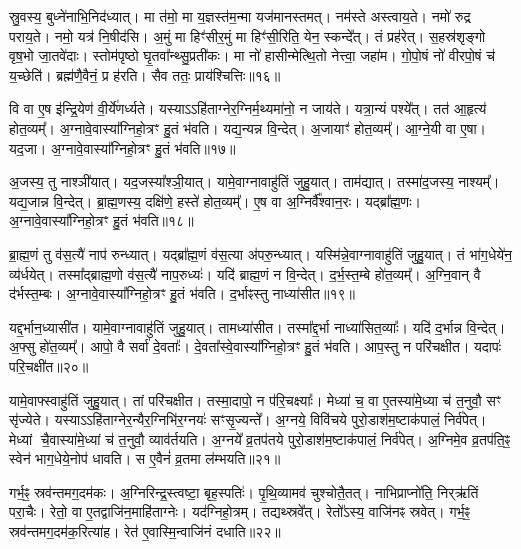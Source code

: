 स्रु॒वस्य॒ बुध्ने॑नाभि॒निद॑ध्यात्।
मा त॑मो॒ मा य॒ज्ञस्त॑म॒न्मा यज॑मानस्तमत्।
नम॑स्ते अस्त्वाय॒ते।
नमो॑ रुद्र पराय॒ते।
नमो॒ यत्र॑ नि॒षीद॑सि।
अ॒मुं मा हिꣳ॑सीर॒मुं मा हिꣳ॑सी॒रिति॒ येन॒ स्कन्दे᳚त्।
तं प्रह॑रेत्।
स॒हस्र॑शृङ्गो वृष॒भो जा॒तवे॑दाः।
स्तोम॑पृष्ठो घृ॒तवा᳚न्थ्सु॒प्रती॑कः।
मा नो॑ हासीन्मेत्थि॒तो नेत्त्वा॒ जहा॑म।
गो॒पो॒षं नो॑ वीरपो॒षं च॑ य॒च्छेति॑।
ब्रह्म॑णै॒वैनं॒ प्र ह॑रति।
सैव ततः॒ प्राय॑श्चित्तिः॥१६॥

वि वा ए॒ष इ॑न्द्रि॒येण॑ वी॒र्ये॑णर्ध्यते।
यस्याऽऽहि॑ताग्ने\-र॒ग्निर्म॒थ्य\-मा॑नो॒ न जाय॑ते।
यत्रा॒न्यं पश्ये᳚त्।
तत॑ आ॒हृत्य॑ होत॒व्यम्᳚।
अ॒ग्नावे॒वास्या᳚ग्निहो॒त्रꣳ हु॒तं भ॑वति।
यद्य॒न्यन्न वि॒न्देत्।
अ॒जायाꣳ॑ होत॒व्यम्᳚।
आ॒ग्ने॒यी वा ए॒षा।
यद॒जा।
अ॒ग्नावे॒वास्या᳚ग्निहो॒त्रꣳ हु॒तं भ॑वति॥१७॥

अ॒जस्य॒ तु नाश्ञी॑यात्।
यद॒जस्या᳚श्ञी॒यात्।
यामे॒वाग्नावाहु॑तिं जुहु॒यात्।
ताम॑द्यात्।
तस्मा॑द॒जस्य॒ नाश्यम्᳚।
यद्य॒जान्न वि॒न्देत्।
ब्रा॒ह्म॒णस्य॒ दक्षि॑णे॒ हस्ते॑ होत॒व्यम्᳚।
ए॒ष वा अ॒ग्निर्वै᳚श्वान॒रः।
यद्ब्रा᳚ह्म॒णः।
अ॒ग्नावे॒वास्या᳚ग्निहो॒त्रꣳ हु॒तं भ॑वति॥१८॥

ब्रा॒ह्म॒णं तु व॑स॒त्यै॑ नाप॑ रुन्ध्यात्।
यद्ब्रा᳚ह्म॒णं व॑स॒त्या अ॑परु॒न्ध्यात्।
यस्मि॑न्ने॒वाग्नावाहु॑तिं जुहु॒यात्।
तं भा॑ग॒धेये॑न॒ व्य॑र्धयेत्।
तस्मा᳚द्ब्राह्म॒णो व॑स॒त्यै॑ नाप॒रुध्यः॑।
यदि॑ ब्राह्म॒णं न वि॒न्देत्।
द॒र्भ॒स्त॒म्बे हो॑त॒व्यम्᳚।
अ॒ग्नि॒वान् वै द॑र्भस्त॒म्बः।
अ॒ग्नावे॒वास्या᳚ग्निहो॒त्रꣳ हु॒तं भ॑वति।
द॒र्भाꣴस्तु नाध्या॑सीत॥१९॥

यद्द॒र्भान॒ध्यासी॑त।
यामे॒वाग्नावाहु॑तिं जुहु॒यात्।
तामध्या॑सीत।
तस्मा᳚द्द॒र्भा नाध्या॑सित॒व्याः᳚।
यदि॑ द॒र्भान्न वि॒न्देत्।
अ॒फ्सु हो॑त॒व्यम्᳚।
आपो॒ वै सर्वा॑ दे॒वताः᳚।
दे॒वता᳚स्वे॒वास्या᳚ग्निहो॒त्रꣳ हु॒तं भ॑वति।
आप॒स्तु न परि॑चक्षीत।
यदापः॑ परि॒चक्षी॑त॥२०॥

यामे॒वाफ्स्वाहु॑तिं जुहु॒यात्।
तां परि॑चक्षीत।
तस्मा॒दापो॒ न प॑रि॒चक्ष्याः᳚।
मेध्या॑ च॒ वा ए॒तस्या॑मे॒ध्या च॑ त॒नुवौ॒ सꣳ सृ॑ज्येते।
यस्याऽऽहि॑ताग्नेर॒न्यैर॒ग्निभि॑र॒ग्नयः॑ सꣳसृ॒ज्यन्ते᳚।
अ॒ग्नये॒ विवि॑चये पुरो॒डाश॑म॒ष्टाक॑पालं॒ निर्व॑पेत्।
मेध्यां चै॒वास्या॑मे॒ध्यां च॑ त॒नुवौ॒ व्याव॑र्तयति।
अ॒ग्नये᳚ व्र॒तप॑तये पुरो॒डाश॑म॒ष्टाक॑पालं॒ निर्व॑पेत्।
अ॒ग्निमे॒व व्र॒तप॑ति॒ꣴ॒ स्वेन॑ भाग॒धेये॒नोप॑ धावति।
स ए॒वैनं॑ व्र॒तमा ल॑म्भयति॥२१॥

गर्भ॒ꣴ॒ स्रव॑न्तमग॒दम॑कः।
अ॒ग्निरिन्द्र॒स्त्वष्टा॒ बृह॒स्पतिः॑।
पृ॒थि॒व्यामव॑ चुश्चोतै॒तत्।
नाभिप्राप्नो॑ति॒ निर्‌\mbox{}ऋ॑तिं परा॒चैः।
रेतो॒ वा ए॒तद्वाजि॑न॒माहि॑ताग्नेः।
यद॑ग्निहो॒त्रम्।
तद्यथ्स्रवे᳚त्।
रेतो᳚\-ऽस्य॒ वाजि॑नꣴ स्रवेत्।
गर्भ॒ꣴ॒ स्रव॑न्तमग॒दम॑क॒रित्या॑ह।
रेत॑ ए॒वास्मि॒न्वाजि॑नं दधाति॥२२॥

